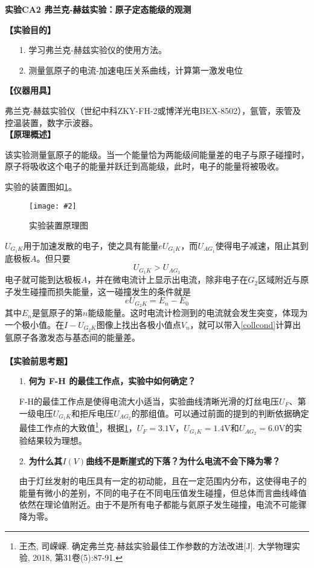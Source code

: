 \documentclass[11pt,a4paper]{ctexart}
\newcommand{\ExpeName}{实验CA2 弗兰克-赫兹实验：原子定态能级的观测}
\newcommand{\cpic}[2]{
\begin{center}
\texttt{[image: \#2]}
\end{center}
}
\newcommand{\cpicn}[3]
{
\begin{figure}[h!]
\cpic{#1}{#2}
\caption{#3\label{#2}}
\end{figure}
}
\newcommand{\beq}{\begin{equation}}
\newcommand{\eeq}{\end{equation}}
\newcommand{\volt}{\mathrm{V}}
\begin{document}
\newpage%
\begin{center}
\LARGE{\textbf{\ExpeName}}
\end{center}
\textbf{【实验目的】}
\begin{enumerate}
 \item[1.]学习弗兰克-赫兹实验仪的使用方法。
 \item[2.]测量氩原子的电流-加速电压关系曲线，计算第一激发电位
\end{enumerate}
\textbf{【仪器用具】}\par
弗兰克-赫兹实验仪（世纪中科ZKY-FH-2或博洋光电BEX-8502），氩管，汞管及控温装置，数字示波器。  \\ 
\textbf{【原理概述】}\par
该实验测量氩原子的能级。当一个能量恰为两能级间能量差的电子与原子碰撞时，原子将吸收这个电子的能量并跃迁到高能级，此时，电子的能量将被吸收。
\par
实验的装置图如\cref{princ1}。
\cpicn{0.5}{princ1}{实验装置原理图}
$U_{G_1 K}$用于加速发散的电子，使之具有能量$eU_{G_1 K}$，而$U_{AG_1}$使得电子减速，阻止其到底极板$A$。但只要
\beq
U_{G_1 K} > U_{AG_1}
\eeq
电子就可能到达极板$A$，并在微电流计上显示出电流，除非电子在$G_2$区域附近与原子发生碰撞而损失能量，这一碰撞发生的条件就是
\beq \label{collcond}
eU_{G_2 K} = E_n - E_0
\eeq
其中$E_n$是氩原子的第$n$能级能量。这时电流计检测到的电流就会发生突变，体现为一个极小值。在$I - U_{G_2 K}$图像上找出各极小值点$V_n$，就可以带入\cref{collcond}计算出氩原子各激发态与基态间的能量差。
\\
\ 
\\
\textbf{【实验前思考题】}
\begin{enumerate}
 \item[1.]\textbf{何为 F-H 的最佳工作点，实验中如何确定？}\par
F-H的最佳工作点是使得电流大小适当，实验曲线清晰光滑的灯丝电压$U_F$、第一级电压$U_{G_1 K}$和拒斥电压$U_{AG_2}$的那组值。可以通过前面的提到的判断依据确定最佳工作点的大致值\footnote{王杰, 司嵘嵘. 确定弗兰克-赫兹实验最佳工作参数的方法改进[J]. 大学物理实验, 2018, 第31卷(5):87-91.\label{bestpt}}，根据\cref{bestpt}，$U_F= 3.1\volt$，$U_{G_1 K} = 1.4\volt$和$U_{AG_2} = 6.0\volt$的实验结果较为理想。
 \item[2.]\textbf{为什么其$I(V)$曲线不是断崖式的下落？为什么电流不会下降为零？}\par
由于灯丝发射的电压具有一定的初动能，且在一定范围内分布，这使得电子的能量有微小的差别，不同的电子在不同电压值发生碰撞，但总体而言曲线峰值依然在理论值附近。由于不是所有电子都能与氦原子发生碰撞，电流不可能骤降为零。
\end{enumerate}
\end{document}
